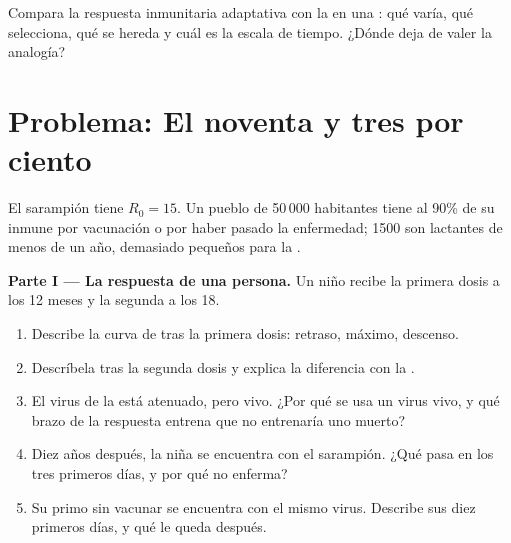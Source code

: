 \begin{exercise}[$\star\star\star$]\label{exo:g12:adaptive-immunity:15}
Compara la respuesta inmunitaria adaptativa con la  en
una : qué varía, qué selecciona, qué se hereda y cuál es la
escala de tiempo. ¿Dónde deja de valer la analogía?
\end{exercise}

\section{Problema: El noventa y tres por ciento}

\begin{problem}
\label{pb:g12:adaptive-immunity:1}
El sarampión tiene $R_0 = 15$. Un pueblo de 50\,000 habitantes tiene al
90\% de su  inmune por vacunación o por haber pasado la
enfermedad; 1500 son lactantes de menos de un año, demasiado pequeños
para la .

\medskip
\noindent\textbf{Parte I --- La respuesta de una persona.}
Un niño recibe la primera dosis a los 12 meses y la segunda a los 18.
\begin{enumerate}
  \item Describe la curva de  tras la primera dosis:
        retraso, máximo, descenso.
  \item Descríbela tras la segunda dosis y explica la diferencia con la
        .
  \item El virus de la  está atenuado, pero vivo. ¿Por qué se usa
        un virus vivo, y qué brazo de la respuesta entrena que no
        entrenaría uno muerto?
  \item Diez años después, la niña se encuentra con el sarampión. ¿Qué
        pasa en los tres primeros días, y por qué no enferma?
  \item Su primo sin vacunar se encuentra con el mismo virus. Describe
        sus diez primeros días, y qué le queda después.
\end{enumerate}


\end{problem}
